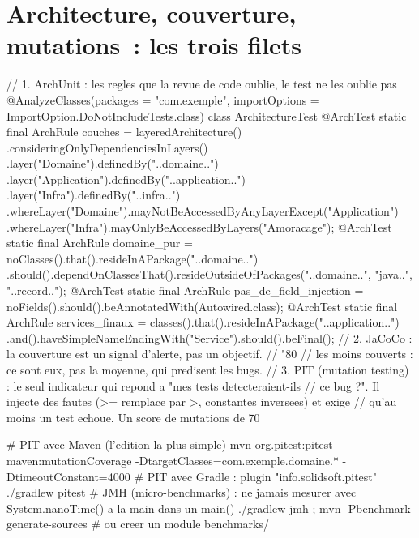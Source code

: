 \section{Architecture, couverture, mutations~: les trois filets}

\begin{codejava}
// 1. ArchUnit : les regles que la revue de code oublie, le test ne les oublie pas
@AnalyzeClasses(packages = "com.exemple", importOptions = ImportOption.DoNotIncludeTests.class)
class ArchitectureTest {
    @ArchTest static final ArchRule couches = layeredArchitecture()
            .consideringOnlyDependenciesInLayers()
            .layer("Domaine").definedBy("..domaine..")
            .layer("Application").definedBy("..application..")
            .layer("Infra").definedBy("..infra..")
            .whereLayer("Domaine").mayNotBeAccessedByAnyLayerExcept("Application")
            .whereLayer("Infra").mayOnlyBeAccessedByLayers("Amoracage");
    @ArchTest static final ArchRule domaine_pur = noClasses().that().resideInAPackage("..domaine..")
            .should().dependOnClassesThat().resideOutsideOfPackages("..domaine..", "java..", "..record..");
    @ArchTest static final ArchRule pas_de_field_injection =
            noFields().should().beAnnotatedWith(Autowired.class);
    @ArchTest static final ArchRule services_finaux = classes().that().resideInAPackage("..application..")
            .and().haveSimpleNameEndingWith("Service").should().beFinal();
}
// 2. JaCoCo : la couverture est un signal d'alerte, pas un objectif.
//    "80 %
//    les moins couverts : ce sont eux, pas la moyenne, qui predisent les bugs.
// 3. PIT (mutation testing) : le seul indicateur qui repond a "mes tests detecteraient-ils
//    ce bug ?". Il injecte des fautes (>= remplace par >, constantes inversees) et exige
//    qu'au moins un test echoue. Un score de mutations de 70 %
\end{codejava}

\begin{terminal}
# PIT avec Maven (l'edition la plus simple)
mvn org.pitest:pitest-maven:mutationCoverage -DtargetClasses=com.exemple.domaine.* -DtimeoutConstant=4000
# PIT avec Gradle : plugin "info.solidsoft.pitest"
./gradlew pitest
# JMH (micro-benchmarks) : ne jamais mesurer avec System.nanoTime() a la main dans un main()
./gradlew jmh ; mvn -Pbenchmark generate-sources  # ou creer un module benchmarks/
\end{terminal}

